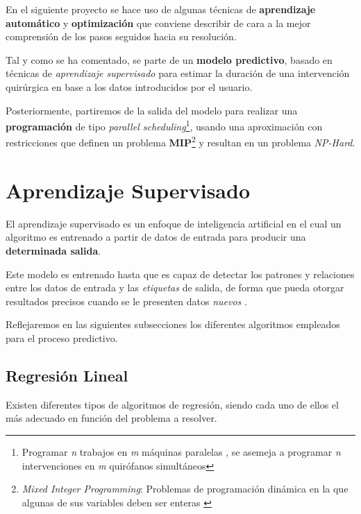 
En el siguiente proyecto se hace uso de algunas técnicas de \textbf{aprendizaje automático} y \textbf{optimización} que conviene describir de cara a la mejor comprensión de los pasos seguidos hacia su resolución.

Tal y como se ha comentado, se parte de un \textbf{modelo predictivo}, basado en técnicas de \textit{aprendizaje supervisado} para estimar la duración de una intervención quirúrgica en base a los datos introducidos por el usuario.

Posteriormente, partiremos de la salida del modelo para realizar una \textbf{programación} de tipo \textit{parallel scheduling}\footnote{Programar \textit{n} trabajos en \textit{m} máquinas paralelas \cite{Xing2000ParallelJobs}, se asemeja a programar \textit{n} intervenciones en \textit{m} quirófanos simultáneos}, usando una aproximación con restricciones que definen un problema \textbf{MIP}\footnote{\textit{Mixed Integer Programming}: Problemas de programación dinámica en la que algunas de sus variables deben ser enteras  \cite{RichardsMixed-integerControl}} \cite{Lin2020AScheduling}  y resultan en un problema \textit{NP-Hard}.



\section{Aprendizaje Supervisado}

El aprendizaje supervisado es un enfoque de inteligencia artificial en el cual un algoritmo es entrenado a partir de datos de entrada para producir una \textbf{determinada salida}. 

Este modelo es entrenado hasta que es capaz de detectar los patrones y relaciones entre los datos de entrada y las \textit{etiquetas} de salida, de forma que pueda otorgar resultados precisos cuando se le presenten datos \textit{nuevos} \cite{PeterssonSupervisedLearning}.

Reflejaremos en las siguientes subsecciones los diferentes algoritmos empleados para el proceso predictivo.

\subsection{Regresión Lineal}

Existen diferentes tipos de algoritmos de regresión, siendo cada uno de ellos el más adecuado en función del problema a resolver.

